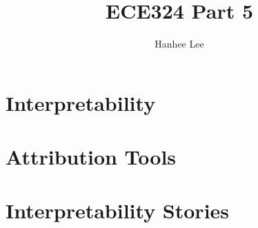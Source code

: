 \documentclass{article}
\title{ECE324 Part 5}
\author{Hanhee Lee}
\begin{document}
\section{Interpretability}

\newpage

\section{Attribution Tools}

\newpage

\section{Interpretability Stories}

\end{document}
